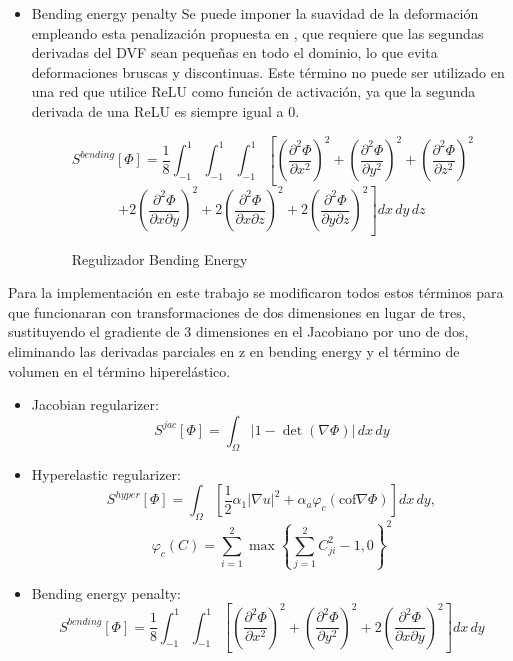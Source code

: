 \begin{itemize}
    \item Bending energy penalty
    Se puede imponer la suavidad de la deformación empleando esta penalización propuesta en \cite{bendingenergy}, que
    requiere que las segundas derivadas del DVF sean pequeñas en todo el dominio, lo que evita deformaciones bruscas y discontinuas.
    Este término no puede ser utilizado en una red que utilice ReLU como función de activación, ya que la segunda derivada de una ReLU es siempre igual a 0.

    \begin{figure}[tbp]
        \centering
        \[
        S^{bending}[\Phi] = \frac{1}{8} \int_{-1}^{1} \int_{-1}^{1} \int_{-1}^{1} \left[ \left( \frac{\partial^2 \Phi}{\partial x^2} \right)^2 + \left( \frac{\partial^2 \Phi}{\partial y^2} \right)^2 + \left( \frac{\partial^2 \Phi}{\partial z^2} \right)^2 \right.
        \]
        \[
        \left. + 2 \left( \frac{\partial^2 \Phi}{\partial x \partial y} \right)^2 + 2 \left( \frac{\partial^2 \Phi}{\partial x \partial z} \right)^2 + 2 \left( \frac{\partial^2 \Phi}{\partial y \partial z} \right)^2 \right] dx\,dy\,dz
        \]
        \caption{Regulizador Bending Energy}
    \end{figure}
    
\end{itemize}

Para la implementación en este trabajo se modificaron todos estos términos para que funcionaran con transformaciones de dos dimensiones en lugar de tres,
sustituyendo el gradiente de 3 dimensiones en el Jacobiano por uno de dos, eliminando las derivadas parciales en z en bending energy y el término de volumen en el término hiperelástico.

\begin{itemize}
    \item Jacobian regularizer:\\
    \[
    S^{jac}[\Phi] = \int_{\Omega} \left| 1 - \det \left( \nabla \Phi \right) \right| \, dx \, dy
    \]
    \item Hyperelastic regularizer:\\
    \[
    S^{hyper}[\Phi] = \int_{\Omega} \left[ \frac{1}{2} \alpha_1 |\nabla u|^2 + \alpha_a \varphi_c (\text{cof} \nabla \Phi) \right] dx \, dy,
    \]
    \[
    \varphi_c(C) = \sum_{i=1}^2 \max \left\{ \sum_{j=1}^2 C_{ji}^2 - 1, 0 \right\}^2
    \]
    \item Bending energy penalty:\\
    \[
    S^{bending}[\Phi] = \frac{1}{8} \int_{-1}^{1} \int_{-1}^{1} \left[ \left( \frac{\partial^2 \Phi}{\partial x^2} \right)^2 + \left( \frac{\partial^2 \Phi}{\partial y^2} \right)^2 + 2 \left( \frac{\partial^2 \Phi}{\partial x \partial y} \right)^2 \right] dx \, dy
    \]
\end{itemize}

